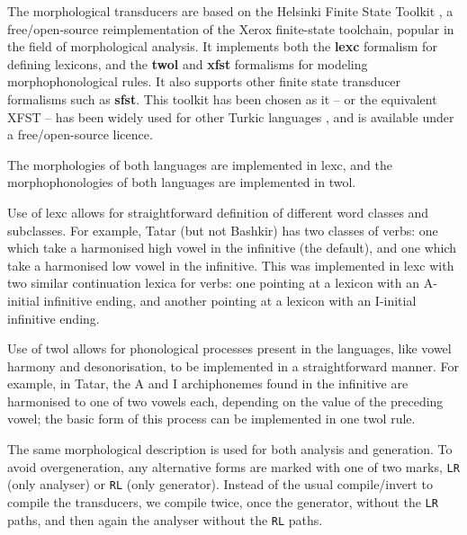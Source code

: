 \documentclass[11pt]{article}
\begin{document}
The morphological transducers are based on the Helsinki Finite State Toolkit \citep{hfst/2011}, a free/open-source reimplementation of the Xerox finite-state toolchain, popular in the field of morphological analysis. It implements both the \textbf{lexc} formalism for defining lexicons, and the \textbf{twol} and \textbf{xfst} formalisms for modeling morphophonological rules. It also supports other finite state transducer formalisms such as \textbf{sfst}. This toolkit has been chosen as it -- or the equivalent XFST -- has been widely used for other Turkic languages \citep{coltekin2010,altintas2001,tantug2006}, and is available under a free/open-source licence.

The morphologies of both languages are implemented in lexc, and the morphophonologies of both languages are implemented in twol.

Use of lexc allows for straightforward definition of different word classes and subclasses.  For example, Tatar (but not Bashkir) has two classes of verbs: one which take a harmonised high vowel in the infinitive (the default), and one which take a harmonised low vowel in the infinitive.  This was implemented in lexc with two similar continuation lexica for verbs: one pointing at a lexicon with an A-initial infinitive ending, and another pointing at a lexicon with an I-initial infinitive ending.

Use of twol allows for phonological processes present in the languages, like vowel harmony and desonorisation, to be implemented in a straightforward manner.  For example, in Tatar, the A and I archiphonemes found in the infinitive are harmonised to one of two vowels each, depending on the value of the preceding vowel; the basic form of this process can be implemented in one twol rule.

The same morphological description is used for both analysis and generation. To avoid overgeneration, any alternative forms are 
marked with one of two marks, {\tt {\small LR}} (only analyser) or {\tt {\small RL}} (only generator). Instead of the usual
compile/invert to compile the transducers, we compile twice, once the generator, without the {\tt {\small LR}} paths, and
then again the analyser without the {\tt {\small RL}} paths. 
\end{document}
